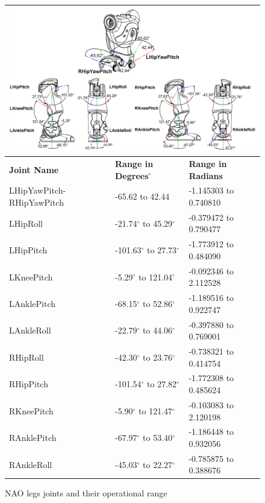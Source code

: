 \begin{figure}
\begin{tabular}{|p{5cm}|p{5cm}|p{5cm}|}
\multicolumn{3}{p{15cm}}{\centering \includegraphics[width = 15cm]{Figures/legsjoints.png}} \\ \hline
\textbf{Joint Name} & \textbf{Range in Degrees$^{\circ}$} & \textbf{Range in Radians} \\ \hline
LHipYawPitch-RHipYawPitch & -65.62 to 42.44 & -1.145303 to 0.740810 \\ \hline
LHipRoll & -21.74$^{\circ}$ to 45.29$^{\circ}$ & -0.379472 to 0.790477 \\ \hline
LHipPitch & -101.63$^{\circ}$ to 27.73$^{\circ}$ & -1.773912 to 0.484090 \\ \hline
LKneePitch & -5.29$^{\circ}$ to 121.04$^{\circ}$ & -0.092346 to 2.112528 \\ \hline
LAnklePitch & -68.15$^{\circ}$ to 52.86$^{\circ}$ & -1.189516 to 0.922747 \\ \hline
LAnkleRoll & -22.79$^{\circ}$ to 44.06$^{\circ}$ & -0.397880 to 0.769001 \\ \hline
RHipRoll & -42.30$^{\circ}$ to 23.76$^{\circ}$ & -0.738321 to 0.414754 \\ \hline
RHipPitch & -101.54$^{\circ}$ to 27.82$^{\circ}$ & -1.772308 to 0.485624 \\ \hline
RKneePitch & -5.90$^{\circ}$ to 121.47$^{\circ}$ & -0.103083 to 2.120198 \\ \hline
RAnklePitch & -67.97$^{\circ}$ to 53.40$^{\circ}$ & -1.186448 to 0.932056 \\ \hline
RAnkleRoll & -45.03$^{\circ}$ to 22.27$^{\circ}$ & -0.785875 to 0.388676 \\ \hline
\end{tabular}
\caption{NAO legs joints and their operational range}
\label{fig:ljoints}
\end{figure}

